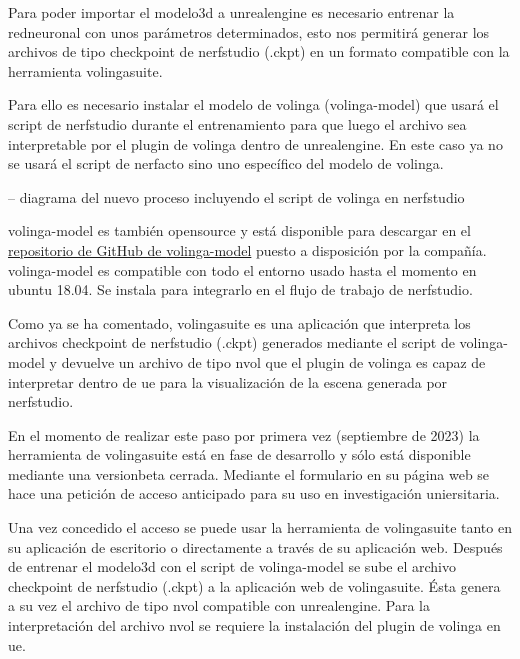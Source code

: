 \documentclass[a4paper, 12pt, spanish, twoside]{article}
\begin{document}
Para poder importar el \gls{modelo3d} a \gls{unrealengine} es necesario entrenar la \gls{redneuronal} con unos parámetros determinados, esto nos permitirá generar los archivos de tipo checkpoint de \gls{nerfstudio} (.ckpt) en un formato compatible con la herramienta \gls{volingasuite}. 

Para ello es necesario instalar el modelo de \gls{volinga} (\gls{volinga-model}) que usará el \gls{script} de \gls{nerfstudio}  durante el entrenamiento para que luego el archivo sea interpretable por el \gls{plugin} de \gls{volinga} dentro de \gls{unrealengine}. En este caso ya no se usará el script de \gls{nerfacto} sino uno específico del modelo de \gls{volinga}. 

-- diagrama del nuevo proceso incluyendo el script de volinga en nerfstudio 

\Gls{volinga-model} es también \gls{opensource} y está disponible para descargar en el \href{https://github.com/Volinga/volinga-model}{repositorio de GitHub de \gls{volinga-model}} puesto a disposición por la compañía. \Gls{volinga-model} es compatible con todo el entorno usado hasta el momento en \gls{ubuntu} 18.04. Se instala para integrarlo en el flujo de trabajo de \gls{nerfstudio}. 

Como ya se ha comentado, \gls{volingasuite} es una aplicación que interpreta los archivos checkpoint de \gls{nerfstudio} (.ckpt) generados mediante el script de \gls{volinga-model} y devuelve un archivo de tipo \gls{nvol} que el \gls{plugin} de \gls{volinga} es capaz de interpretar dentro de \acrshort{ue} para la visualización de la escena generada por \gls{nerfstudio}. 

En el momento de realizar este paso por primera vez (septiembre de 2023) la herramienta de \gls{volingasuite} está en fase de desarrollo y sólo está disponible mediante una \gls{versionbeta} cerrada. Mediante el formulario en su página web se hace una petición de acceso anticipado para su uso en investigación uniersitaria.  

Una vez concedido el acceso se puede usar la herramienta de \gls{volingasuite} tanto en su aplicación de escritorio o directamente a través de su aplicación web. Después de entrenar el \gls{modelo3d} con el script de \gls{volinga-model} se sube el archivo checkpoint de \gls{nerfstudio} (.ckpt) a la aplicación web de \gls{volingasuite}. Ésta genera a su vez el archivo de tipo \gls{nvol} compatible con \gls{unrealengine}. Para la interpretación del archivo \gls{nvol} se requiere la instalación del \gls{plugin} de \gls{volinga} en \acrshort{ue}. 
\end{document}
